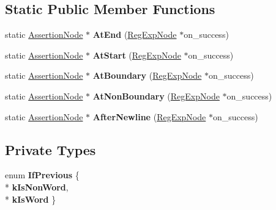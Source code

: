 \subsection*{Static Public Member Functions}
\begin{DoxyCompactItemize}
\item 
static \hyperlink{classv8_1_1internal_1_1_assertion_node}{Assertion\+Node} $\ast$ {\bfseries At\+End} (\hyperlink{classv8_1_1internal_1_1_reg_exp_node}{Reg\+Exp\+Node} $\ast$on\+\_\+success)\hypertarget{classv8_1_1internal_1_1_assertion_node_a7663a6a9a51975492c0bfe7b5a61a832}{}\label{classv8_1_1internal_1_1_assertion_node_a7663a6a9a51975492c0bfe7b5a61a832}

\item 
static \hyperlink{classv8_1_1internal_1_1_assertion_node}{Assertion\+Node} $\ast$ {\bfseries At\+Start} (\hyperlink{classv8_1_1internal_1_1_reg_exp_node}{Reg\+Exp\+Node} $\ast$on\+\_\+success)\hypertarget{classv8_1_1internal_1_1_assertion_node_ac3c21366bba17cf86759c0cdea7ae035}{}\label{classv8_1_1internal_1_1_assertion_node_ac3c21366bba17cf86759c0cdea7ae035}

\item 
static \hyperlink{classv8_1_1internal_1_1_assertion_node}{Assertion\+Node} $\ast$ {\bfseries At\+Boundary} (\hyperlink{classv8_1_1internal_1_1_reg_exp_node}{Reg\+Exp\+Node} $\ast$on\+\_\+success)\hypertarget{classv8_1_1internal_1_1_assertion_node_ac281096ab369662a023267aac4117bfd}{}\label{classv8_1_1internal_1_1_assertion_node_ac281096ab369662a023267aac4117bfd}

\item 
static \hyperlink{classv8_1_1internal_1_1_assertion_node}{Assertion\+Node} $\ast$ {\bfseries At\+Non\+Boundary} (\hyperlink{classv8_1_1internal_1_1_reg_exp_node}{Reg\+Exp\+Node} $\ast$on\+\_\+success)\hypertarget{classv8_1_1internal_1_1_assertion_node_ad6d20cd648da9b791ca9f35367f2470e}{}\label{classv8_1_1internal_1_1_assertion_node_ad6d20cd648da9b791ca9f35367f2470e}

\item 
static \hyperlink{classv8_1_1internal_1_1_assertion_node}{Assertion\+Node} $\ast$ {\bfseries After\+Newline} (\hyperlink{classv8_1_1internal_1_1_reg_exp_node}{Reg\+Exp\+Node} $\ast$on\+\_\+success)\hypertarget{classv8_1_1internal_1_1_assertion_node_aa84ccd02ac323be278e3cb07633793b0}{}\label{classv8_1_1internal_1_1_assertion_node_aa84ccd02ac323be278e3cb07633793b0}

\end{DoxyCompactItemize}
\subsection*{Private Types}
\begin{DoxyCompactItemize}
\item 
enum {\bfseries If\+Previous} \{ \\*
{\bfseries k\+Is\+Non\+Word}, 
\\*
{\bfseries k\+Is\+Word}
 \}\hypertarget{classv8_1_1internal_1_1_assertion_node_addcaff6060714517cb91aa289dd72dfa}{}\label{classv8_1_1internal_1_1_assertion_node_addcaff6060714517cb91aa289dd72dfa}

\end{DoxyCompactItemize}
